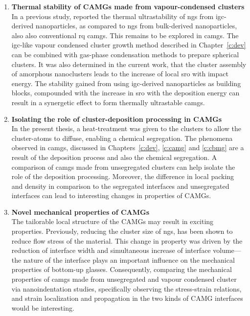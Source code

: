 \begin{enumerate}[leftmargin=*]
\item \textbf{Thermal stability of CAMGs made from vapour-condensed clusters}\\
In a previous study, \textcite{Danilov2016} reported the thermal ultrastability of \gls{ng}s from \gls{igc}-derived nanoparticles, as compared to \gls{ng}s from bulk-derived nanoparticles, also also conventional \gls{rq} \gls{camg}s. This remains to be explored in \gls{camg}s. The \gls{igc}-like vapour condensed cluster growth method described in Chapter~\ref{c:dev} can be combined with gas-phase condensation methods \cite{Krasnochtchekov2003,Zheng2020} to prepare spherical \cz clusters. It was also determined in the current work, that the cluster assembly of amorphous nanoclusters leads to the increase of local \gls{sro} with impact energy. The stability gained from using \gls{igc}-derived nanoparticles as building blocks, compounded with the increase in \gls{sro} with the deposition energy can result in a synergetic effect to form thermally ultrastable \gls{camg}s.

\item \textbf{Isolating the role of cluster-deposition processing in CAMGs}\\
In the present thesis, a heat-treatment was given to the clusters to allow the cluster-atoms to diffuse, enabling a chemical segregation. The phenomena observed in \gls{camg}s, discussed in Chapters~\ref{c:dev}, \ref{c:camg} and \ref{c:cbmg} are a result of the deposition process and also the chemical segregation. A comparison of \gls{camg}s made from unsegregated clusters can help isolate the role of the deposition processing. Moreover, the difference in local packing and density in comparison to the segregated interfaces and unsegregated interfaces can lead to interesting changes in properties of CAMGs.

\item \textbf{Novel mechanical properties of CAMGs} \\
The tailorable local structure of the CAMGs may result in exciting properties. Previously, reducing the cluster size of \gls{ng}s, has been shown to reduce flow stress \cite{Adibi2014,Cheng2019a} of the material. This change in property was driven by the reduction of interface width and simultaneous increase of interface volume---the nature of the interface plays an important influence on the mechanical properties of bottom-up glasses. Consequently, comparing the mechanical properties of \gls{camg}s made from unsegregated and vapour condensed cluster via nanoindentation studies, specifically observing the stress-strain relations, and strain localization and propagation in the two kinds of CAMG interfaces would be interesting.


\end{enumerate}
